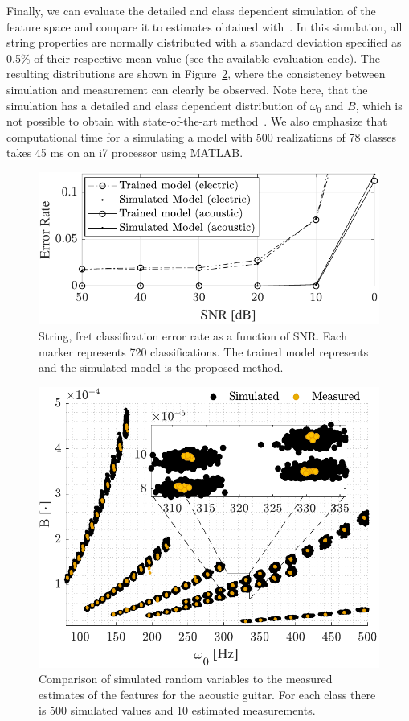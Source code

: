 Finally, we can evaluate the detailed and class dependent simulation of the feature space and compare it to estimates obtained with~\cite{hjerrild::icassp19}. In this simulation, all string properties are normally distributed with a standard deviation specified as 0.5\% of their respective mean value (see the available evaluation code). The resulting distributions are shown in Figure~\ref{fig:string_and_fret_model}, where the consistency between simulation and measurement can clearly be observed. Note here, that the simulation has a detailed and class dependent distribution of $\omega_0$ and $B$, which is not possible to obtain with state-of-the-art method~\cite{hjerrild::icassp19}. We also emphasize that computational time for a simulating a model with 500 realizations of 78 classes takes 45 ms on an i7 processor using MATLAB. %
%
\begin{figure}[t]
\centering
   \includegraphics[width=.85\linewidth]{img/SNRfig_both.pdf}\vspace{-2mm}
   \caption{String, fret classification error rate as a function of SNR. Each marker represents 720 classifications. The trained model represents~\cite{hjerrild::icassp19} and the simulated model is the proposed method.}
   \label{fig:string_fret_snr} 
\end{figure}
%
\begin{figure}[t]
\centering
   \includegraphics[width=.85\linewidth]{img/w0_vs_B3.pdf}\vspace{-2mm}
   \caption{Comparison of simulated random variables to the measured estimates of the features for the acoustic guitar. For each class there is 500 simulated values and 10 estimated measurements.}
   \label{fig:string_and_fret_model} 
\end{figure}
%